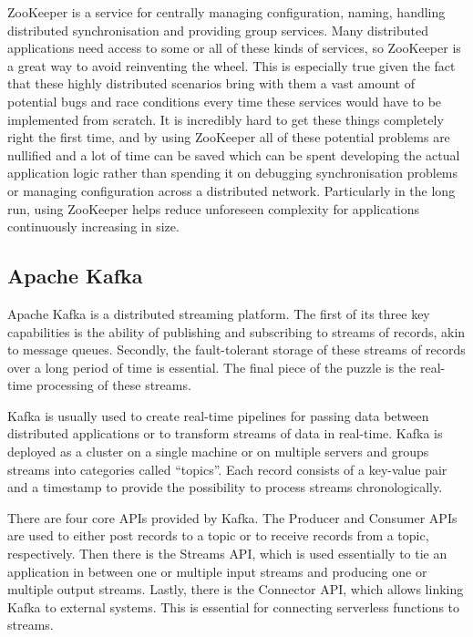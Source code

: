 ZooKeeper is a service for centrally managing configuration, naming, handling distributed
synchronisation and providing group services. Many distributed applications need access to some or
all of these kinds of services, so ZooKeeper is a great way to avoid reinventing the wheel. This is
especially true given the fact that these highly distributed scenarios bring with them a vast amount
of potential bugs and race conditions every time these services would have to be implemented from
scratch. It is incredibly hard to get these things completely right the first time, and by using
ZooKeeper all of these potential problems are nullified and a lot of time can be saved which can be
spent developing the actual application logic rather than spending it on debugging synchronisation
problems or managing configuration across a distributed network. Particularly in the long run, using
ZooKeeper helps reduce unforeseen complexity for applications continuously increasing in size.
\cite{zookeeper-homepage}

\subsection{Apache Kafka}

Apache Kafka is a distributed streaming platform. The first of its three key capabilities is the
ability of publishing and subscribing to streams of records, akin to message queues. Secondly, the
fault-tolerant storage of these streams of records over a long period of time is essential. The
final piece of the puzzle is the real-time processing of these streams.

Kafka is usually used to create real-time pipelines for passing data between distributed
applications or to transform streams of data in real-time. Kafka is deployed as a cluster on a
single machine or on multiple servers and groups streams into categories called “topics”. Each
record consists of a key-value pair and a timestamp to provide the possibility to process streams
chronologically.

There are four core APIs provided by Kafka. The Producer and Consumer APIs are used to either post
records to a topic or to receive records from a topic, respectively. Then there is the Streams API,
which is used essentially to tie an application in between one or multiple input streams and
producing one or multiple output streams. Lastly, there is the Connector API, which allows linking
Kafka to external systems. This is essential for connecting serverless functions to streams.
\cite{kafka-introduction}

